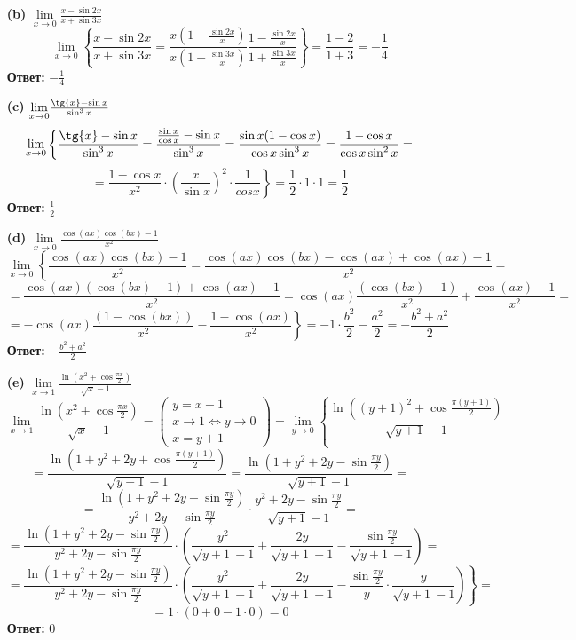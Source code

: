 \documentclass[a4paper]{article}
\newcommand{\mat}[1]{\begin{pmatrix} #1 \end{pmatrix}}
\renewcommand{\f}[2]{\frac{#1}{#2}}
\newcommand{\lm}[1]{\underset{#1}{\lim}}
\newcommand{\lr}{\Leftrightarrow}
\begin{document}
\begin{enumerate}
\begin{enumerate}
        \item[\textbf{(b)}]$\lm{x \to 0}\f{x-\sin{2x}}{x+\sin{3x}}$
        $$\lm{x \to 0} \left\{ \f{x-\sin{2x}}{x+\sin{3x}} = \f{x(1 - \f{\sin{2x}}{x})}{x(1+\f{\sin{3x}}{x})} \f{1 - \f{\sin{2x}}{x}}{1+\f{\sin{3x}}{x}} \right\} = \f{1 - 2}{1+3} = -\f{1}{4} $$
        \textbf{Ответ: } $-\f{1}{4}$\\

        \item[\textbf{(c)}]$\lm{x \to 0} \f{\tg{x}-\sin{x}}{\sin^3{x}}$
        $$\lm{x \to 0} \left\{ \f{\tg{x}-\sin{x}}{\sin^3{x}} = \f{\f{\sin{x}}{\cos{x}}-\sin{x}}{\sin^3{x}} = \f{\sin{x}(1-\cos{x})}{\cos{x}\sin^3{x}} =  \f{1-\cos{x}}{\cos{x}\sin^2{x}} =\right.$$
        $$\left.= \f{1-\cos{x}}{x^2} \cdot (\f{x}{\sin{x}})^2 \cdot \f{1}{cos{x}} \right\} = \f{1}{2}\cdot 1 \cdot 1 = \f{1}{2}$$
        \textbf{Ответ: }$\f{1}{2}$\\

        \item[\textbf{(d)}]$\lm{x\to 0}\f{\cos(ax)\cos(bx) - 1}{x^2}$
        $$\lm{x\to 0}\left\{ \f{\cos(ax)\cos(bx) - 1}{x^2} = \f{\cos(ax)\cos(bx) - \cos(ax) + \cos(ax) - 1}{x^2} =\right.$$
        $$\left.= \f{\cos(ax)(\cos(bx) - 1) + \cos(ax) - 1}{x^2} = \cos(ax)\f{(\cos(bx) - 1)}{x^2} + \f{\cos(ax) - 1}{x^2} = \right.$$
        $$\left. = -\cos(ax)\f{(1 - \cos(bx))}{x^2} - \f{1 - \cos(ax)}{x^2}\right\} = -1 \cdot \f{b^2}{2} - \f{a^2}{2} = -\f{b^2+a^2}{2}$$
        \textbf{Ответ: } $-\f{b^2+a^2}{2}$\\

        \item[\textbf{(e)}]$\lm{x \to 1}\f{\ln(x^2+\cos{\f{\pi x}{2}})}{\sqrt{x}-1}$
        $$\lm{x \to 1} \f{\ln(x^2+\cos{\f{\pi x}{2}})}{\sqrt{x}-1} = \mat{y = x-1 \\x \to 1 \lr y \to 0 \\ x = y+1} = \lm{y \to 0} \left\{\f{\ln((y+1)^2 + \cos{\f{\pi (y+1)}{2}})}{\sqrt{y+1}-1} \right.$$
        $$=\f{\ln(1 + y^2 + 2y + \cos{\f{\pi (y+1)}{2}})}{\sqrt{y+1}-1} = \f{\ln(1 + y^2 + 2y  -\sin{\f{\pi y}{2}})}{\sqrt{y+1}-1} =$$ 
        $$\left. = \f{\ln(1 + y^2 + 2y - \sin{\f{\pi y}{2}})}{y^2 + 2y - \sin{\f{\pi y}{2}}}\cdot \f{y^2 + 2y - \sin{\f{\pi y}{2}}}{\sqrt{y+1}-1} =\right.$$
        $$\left. =\f{\ln(1 + y^2 + 2y - \sin{\f{\pi y}{2}})}{y^2 + 2y - \sin{\f{\pi y}{2}}}\cdot (\f{y^2}{\sqrt{y+1}-1} + \f{2y}{\sqrt{y+1}-1} - \f{\sin{\f{\pi y}{2}}}{\sqrt{y+1}-1}) = \right.$$
        $$\left. =\f{\ln(1 + y^2 + 2y - \sin{\f{\pi y}{2}})}{y^2 + 2y - \sin{\f{\pi y}{2}}}\cdot (\f{y^2}{\sqrt{y+1}-1} + \f{2y}{\sqrt{y+1}-1} - \f{\sin{\f{\pi y}{2}}}{y}\cdot \f{y}{\sqrt{y+1}-1}) \right\} =$$
        $$=1\cdot(0 + 0 - 1 \cdot 0) = 0$$
        \textbf{Ответ: } $0$
        

    \end{enumerate}
    


\end{enumerate}
\end{document}
